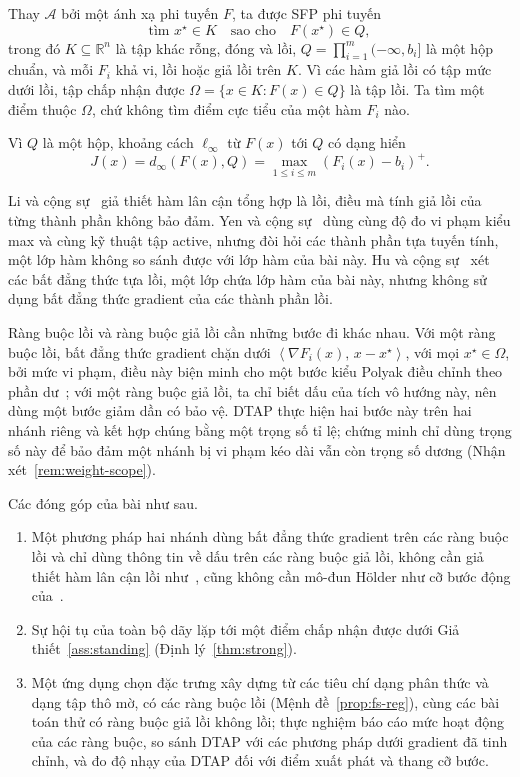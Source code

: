 \documentclass[]{interact}
\theoremstyle{plain}
\theoremstyle{definition}
\theoremstyle{remark}
\newcommand{\R}{\mathbb{R}}
\newcommand{\inner}[2]{\left\langle #1,\, #2 \right\rangle}
\begin{document}
Thay $\mathcal A$ bởi một ánh xạ phi tuyến $F$, ta được SFP phi tuyến~\citep{li2013nsfp,yen2019}
\begin{equation}\label{eq:nsfp-intro}
\text{tìm }x^\star\in K\quad\text{sao cho}\quad F(x^\star)\in Q,
\end{equation}
trong đó $K\subseteq\R^n$ là tập khác rỗng, đóng và lồi, $Q=\prod_{i=1}^m(-\infty,b_i]$ là một hộp chuẩn, và mỗi $F_i$ khả vi, lồi hoặc giả lồi trên $K$. Vì các hàm giả lồi có tập mức dưới lồi, tập chấp nhận được $\Omega=\{x\in K:F(x)\in Q\}$ là tập lồi. Ta tìm một điểm thuộc $\Omega$, chứ không tìm điểm cực tiểu của một hàm $F_i$ nào.

Vì $Q$ là một hộp, khoảng cách $\ell_\infty$ từ $F(x)$ tới $Q$ có dạng hiển
\[
J(x)=d_\infty(F(x),Q)=\max_{1\le i\le m}(F_i(x)-b_i)^+.
\]

Li và cộng sự~\citep{li2013nsfp} giả thiết hàm lân cận tổng hợp là lồi, điều mà tính giả lồi của từng thành phần không bảo đảm. Yen và cộng sự~\citep{yen2019} dùng cùng độ đo vi phạm kiểu max và cùng kỹ thuật tập active, nhưng đòi hỏi các thành phần tựa tuyến tính, một lớp hàm không so sánh được với lớp hàm của bài này. Hu và cộng sự~\citep{hu2022quasi} xét các bất đẳng thức tựa lồi, một lớp chứa lớp hàm của bài này, nhưng không sử dụng bất đẳng thức gradient của các thành phần lồi.

Ràng buộc lồi và ràng buộc giả lồi cần những bước đi khác nhau. Với một ràng buộc lồi, bất đẳng thức gradient chặn dưới $\inner{\nabla F_i(x)}{x-x^\star}$, với mọi $x^\star\in\Omega$, bởi mức vi phạm, điều này biện minh cho một bước kiểu Polyak điều chỉnh theo phần dư~\citep{polyak1969,lopez2012}; với một ràng buộc giả lồi, ta chỉ biết dấu của tích vô hướng này, nên dùng một bước giảm dần có bảo vệ. DTAP thực hiện hai bước này trên hai nhánh riêng và kết hợp chúng bằng một trọng số tỉ lệ; chứng minh chỉ dùng trọng số này để bảo đảm một nhánh bị vi phạm kéo dài vẫn còn trọng số dương (Nhận xét~\ref{rem:weight-scope}).

Các đóng góp của bài như sau.
\begin{enumerate}[label=\textbf{C\arabic*.},leftmargin=2.4em,itemsep=3pt]
\item Một phương pháp hai nhánh dùng bất đẳng thức gradient trên các ràng buộc lồi và chỉ dùng thông tin về dấu trên các ràng buộc giả lồi, không cần giả thiết hàm lân cận lồi như~\citep{li2013nsfp}, cũng không cần mô-đun H\"older như cỡ bước động của~\citep{hu2022quasi}.
\item Sự hội tụ của toàn bộ dãy lặp tới một điểm chấp nhận được dưới Giả thiết~\ref{ass:standing} (Định lý~\ref{thm:strong}).
\item Một ứng dụng chọn đặc trưng xây dựng từ các tiêu chí dạng phân thức và dạng tập thô mờ, có các ràng buộc lồi (Mệnh đề~\ref{prop:fs-reg}), cùng các bài toán thử có ràng buộc giả lồi không lồi; thực nghiệm báo cáo mức hoạt động của các ràng buộc, so sánh DTAP với các phương pháp dưới gradient đã tinh chỉnh, và đo độ nhạy của DTAP đối với điểm xuất phát và thang cỡ bước.
\end{enumerate}
\end{document}
